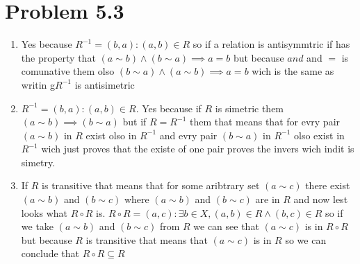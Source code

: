 \documentclass[12pt]{article}
\begin{document}
\section*{Problem 5.3}
\begin{enumerate}[label=\alph*)]
    \item Yes because $R^{-1} = { (b, a) : (a, b) \in R }$ so if a relation is antisymmtric if has the property that $(a\sim b) \land (b\sim a) \implies a=b $ but because $and$ and $=$ is comunative them olso $(b\sim a) \land (a\sim b) \implies a=b$ wich is the same as writin g$R^{-1}$ is antisimetric
    \item $R^{-1} = { (b, a) : (a, b) \in R }$. Yes because if $R$ is simetric them $(a \sim b) \implies (b \sim a)$ but if $R=R^{-1}$ them that means that for evry pair $(a \sim b)$ in $R$ exist olso in $R^{-1}$ and evry pair $(b \sim a)$ in $R^{-1}$ olso exist in $R^{-1}$ wich just proves that the existe of one pair proves the invers wich indit is simetry.
    \item If $R$ is transitive that means that for some aribtrary set $(a\sim c)$ there exist $(a\sim b)$ and $(b\sim c)$ where $(a\sim b)$ and $(b\sim c)$ are in $R$  and now lest looks what $R \circ R$ is. $R \circ R = { (a, c) : \exists b \in X, (a, b) \in R \land (b, c) \in R }$ so if we take $(a\sim b)$ and $(b\sim c)$ from $R$ we can see that $(a\sim c)$ is in $R \circ R$ but because $R$ is transitive that means that $(a\sim c)$ is in $R$ so we can conclude that $R \circ R \subseteq R$
\end{enumerate}
\end{document}
